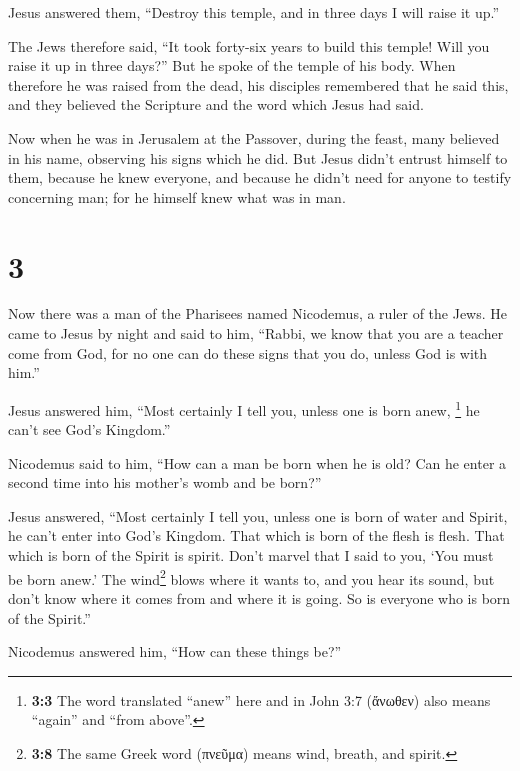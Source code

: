  Jesus answered them, ``Destroy this temple, and in three
days I will raise it up.''

 The Jews therefore said, ``It took forty-six years to
build this temple! Will you raise it up in three days?'' 
But he spoke of the temple of his body.  When therefore
he was raised from the dead, his disciples remembered that he said this,
and they believed the Scripture and the word which Jesus had said.

 Now when he was in Jerusalem at the Passover, during the
feast, many believed in his name, observing his signs which he did.
 But Jesus didn't entrust himself to them, because he
knew everyone,  and because he didn't need for anyone to
testify concerning man; for he himself knew what was in man.

\hypertarget{section-2}{%
\section{3}\label{section-2}}

 Now there was a man of the Pharisees named Nicodemus, a
ruler of the Jews.  He came to Jesus by night and said to
him, ``Rabbi, we know that you are a teacher come from God, for no one
can do these signs that you do, unless God is with him.''

 Jesus answered him, ``Most certainly I tell you, unless
one is born anew, \footnote{\textbf{3:3} The word translated ``anew''
  here and in John 3:7 (ἄνωθεν) also means ``again'' and ``from above''.}
he can't see God's Kingdom.''

 Nicodemus said to him, ``How can a man be born when he is
old? Can he enter a second time into his mother's womb and be born?''

 Jesus answered, ``Most certainly I tell you, unless one
is born of water and Spirit, he can't enter into God's Kingdom.
 That which is born of the flesh is flesh. That which is
born of the Spirit is spirit.  Don't marvel that I said to
you, `You must be born anew.'  The wind\footnote{\textbf{3:8}
  The same Greek word (πνεῦμα) means wind, breath, and spirit.} blows
where it wants to, and you hear its sound, but don't know where it comes
from and where it is going. So is everyone who is born of the Spirit.''

 Nicodemus answered him, ``How can these things be?''

